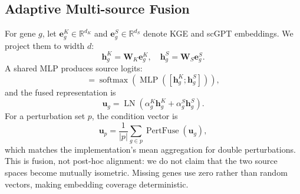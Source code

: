 \documentclass[conference]{IEEEtran}
\newcommand{\R}{\mathbb{R}}
\begin{document}
\subsection{Adaptive Multi-source Fusion}
For gene $g$, let $\mathbf{e}^{K}_g\in\R^{d_K}$ and
$\mathbf{e}^{S}_g\in\R^{d_S}$ denote KGE and scGPT embeddings. We project them
to width $d$:
\begin{equation}
 \mathbf{h}^{K}_g=\mathbf{W}_{K}\mathbf{e}^{K}_g,\quad
 \mathbf{h}^{S}_g=\mathbf{W}_{S}\mathbf{e}^{S}_g.
\end{equation}
A shared MLP produces source logits:
\begin{equation}
 [\alpha^K_g,\alpha^S_g]=\operatorname{softmax}\!\left(
 \operatorname{MLP}([\mathbf{h}^{K}_g;\mathbf{h}^{S}_g])\right),
\end{equation}
and the fused representation is
\begin{equation}
 \mathbf{u}_g=\operatorname{LN}\!\left(
 \alpha^K_g\mathbf{h}^{K}_g+\alpha^S_g\mathbf{h}^{S}_g\right).
\label{eq:fusion}
\end{equation}
For a perturbation set $p$, the condition vector is
\begin{equation}
 \mathbf{u}_p=\frac{1}{|p|}\sum_{g\in p}
 \operatorname{PertFuse}(\mathbf{u}_g),
 \label{eq:condition}
\end{equation}
which matches the implementation's mean aggregation for double perturbations.
This is fusion, not post-hoc alignment: we do not claim that the two source
spaces become mutually isometric. Missing genes use zero rather than random
vectors, making embedding coverage deterministic.
\end{document}
